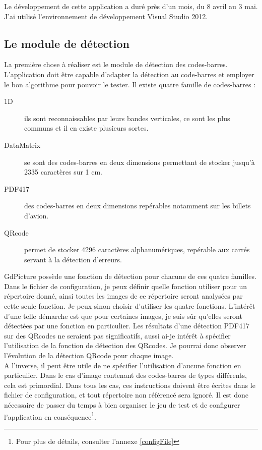 Le développement de cette application a duré près d'un mois, du 8 avril au 3 mai. J'ai utilisé l'environnement de développement Visual Studio 2012.

\subsection{Le module de détection}

La première chose à réaliser est le module de détection des codes-barres. L'application doit être capable d'adapter la détection au code-barres et employer le bon algorithme pour pouvoir le tester.
Il existe quatre famille de codes-barres :

\begin{description}
\item[1D] ils sont reconnaissables par leurs bandes verticales, ce sont les plus communs et il en existe plusieurs sortes.
\item[DataMatrix] se sont des codes-barres en deux dimensions permettant de stocker jusqu'à 2335 caractères sur 1 cm.
\item[PDF417] des codes-barres en deux dimensions repérables notamment sur les billets d'avion.
\item[QRcode] permet de stocker 4296 caractères alphanumériques, repérable aux carrés servant à la détection d'erreurs.
\end{description}

GdPicture possède une fonction de détection pour chacune de ces quatre familles. Dans le fichier de configuration, je peux définir quelle fonction utiliser pour un répertoire donné, ainsi toutes les images de ce répertoire seront analysées par cette seule fonction. Je peux sinon choisir d'utiliser les quatre fonctions. L'intérêt d'une telle démarche est que pour certaines images, je suis sûr qu'elles seront détectées par une fonction en particulier. Les résultats d'une détection PDF417 sur des QRcodes ne seraient pas significatifs, aussi ai-je intérêt à spécifier l'utilisation de la fonction de détection des QRcodes. Je pourrai donc observer l'évolution de la détection QRcode pour chaque image.\\
A l'inverse, il peut être utile de ne spécifier l'utilisation d'aucune fonction en particulier. Dans le cas d'image contenant des codes-barres de types différents, cela est primordial. Dans tous les cas, ces instructions doivent être écrites dans le fichier de configuration, et tout répertoire non référencé sera ignoré. Il est donc nécessaire de passer du temps à bien organiser le jeu de test et de configurer l'application en conséquence\footnote{Pour plus de détails, consulter l'annexe \ref{configFile}}.

